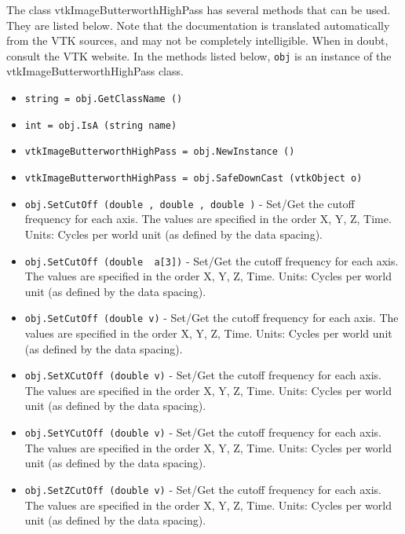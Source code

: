 The class vtkImageButterworthHighPass has several methods that can be used.
  They are listed below.
Note that the documentation is translated automatically from the VTK sources,
and may not be completely intelligible.  When in doubt, consult the VTK website.
In the methods listed below, \verb|obj| is an instance of the vtkImageButterworthHighPass class.
\begin{itemize}
\item  \verb|string = obj.GetClassName ()|

\item  \verb|int = obj.IsA (string name)|

\item  \verb|vtkImageButterworthHighPass = obj.NewInstance ()|

\item  \verb|vtkImageButterworthHighPass = obj.SafeDownCast (vtkObject o)|

\item  \verb|obj.SetCutOff (double , double , double )| -  Set/Get the cutoff frequency for each axis.
 The values are specified in the order X, Y, Z, Time.
 Units: Cycles per world unit (as defined by the data spacing).

\item  \verb|obj.SetCutOff (double  a[3])| -  Set/Get the cutoff frequency for each axis.
 The values are specified in the order X, Y, Z, Time.
 Units: Cycles per world unit (as defined by the data spacing).

\item  \verb|obj.SetCutOff (double v)| -  Set/Get the cutoff frequency for each axis.
 The values are specified in the order X, Y, Z, Time.
 Units: Cycles per world unit (as defined by the data spacing).

\item  \verb|obj.SetXCutOff (double v)| -  Set/Get the cutoff frequency for each axis.
 The values are specified in the order X, Y, Z, Time.
 Units: Cycles per world unit (as defined by the data spacing).

\item  \verb|obj.SetYCutOff (double v)| -  Set/Get the cutoff frequency for each axis.
 The values are specified in the order X, Y, Z, Time.
 Units: Cycles per world unit (as defined by the data spacing).

\item  \verb|obj.SetZCutOff (double v)| -  Set/Get the cutoff frequency for each axis.
 The values are specified in the order X, Y, Z, Time.
 Units: Cycles per world unit (as defined by the data spacing).


\end{itemize}
